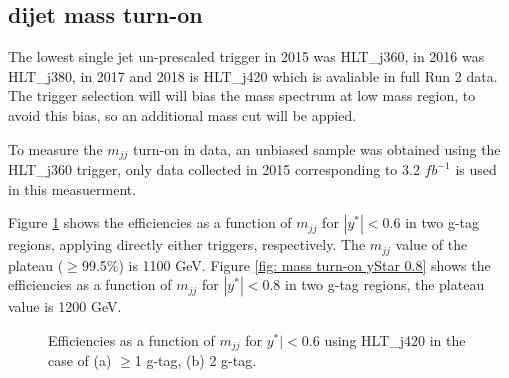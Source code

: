 \subsection{dijet mass turn-on}
\label{section: dijet mass turn-on}

The lowest single jet un-prescaled trigger in 2015 was HLT\_j360, in 2016 was HLT\_j380,
in 2017 and 2018 is HLT\_j420 which is avaliable in full Run 2 data.
The trigger selection will will bias the mass spectrum at low mass region, to avoid this bias, so an additional mass cut will be appied. 

To measure the $m_{jj}$ turn-on in data, an unbiased sample was obtained using the HLT\_j360 trigger, only data collected in 2015 corresponding to 3.2 $fb^{-1}$ is used in this measuerment.

Figure \ref{fig: mass turn-on yStar 0.6} shows the efficiencies as a function of $m_{jj}$ for $|y^{*}|<0.6$ in two g-tag regions, applying directly either triggers, respectively. The $m_{jj}$ value of the plateau ($\geq$99.5\%) is 1100 GeV. Figure \ref{fig: mass turn-on yStar 0.8} shows the efficiencies as a function of $m_{jj}$ for $|y^{*}|<0.8$ in two g-tag regions, the plateau value is 1200 GeV.

\begin{figure}[htbp]
        \centering
        \caption{Efficiencies as a function of $m_{jj}$ for $y^{*}|<0.6$ using HLT\_j420 in the case of (a) $\geq$1 g-tag, (b) 2 g-tag.}
        \label{fig: mass turn-on yStar 0.6}
\end{figure}

